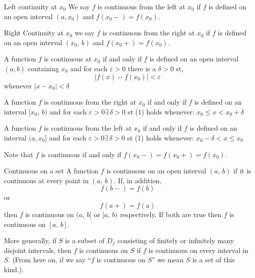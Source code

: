 \documentclass{article}
\renewcommand{\d}{\delta}
\newcommand{\e}{\varepsilon}
\newcommand{\ex}{\exists\,}
\begin{document}
{{\noindent\begin{definition}{Left continuity at $x_0$}{}
  We say $f$ is continuous from the left at $x_0$ if $f$ is defined on an open interval $(a, x_0)$ and $f(x_0-) = f(x_0)$.
\end{definition}\vspace{10pt}

\noindent\begin{definition}{Right Continuity at $x_0$}{}
  we say $f$ is continuous from the right at $x_0$ if $f$ is defined on an open interval $(x_0,\, b)$ and $f(x_0+) = f(x_0)$.
\end{definition}\vspace{10pt}

\begin{theorem}{}{}
  A function $f$ is continuous at $x_0$ if and only if $f$ is defined on an open interval $(a, b)$ containing $x_0$ and for each $\e>0$ there is a $\d>0$ st,
  \begin{equation}
    |f(x) - f(x_0)| < \e
  \end{equation}
  whenever $|x - x_0| < \d$
\end{theorem}

\begin{theorem}{}{}
  A function $f$ is continuous from the right at $x_0$ if and only if $f$ is defined on an interval $[x_0,\, b)$ and for each $\e > 0\ex\d > 0$ st (1) holds whenever: $\displaystyle{x_0 \le x < x_0 + \d}$
\end{theorem}

\begin{theorem}{}{}
  A function $f$ is continuous from the left at $x_0$ if and only if $f$ is defined on an interval $(a, x_0]$ and for each $\e > 0\ex\d > 0$ st (1) holds whenever: $\displaystyle{x_0 - \d < x \le x_0}$
\end{theorem}

Note that $f$ is continuous if and only if $f(x_0-) = f(x_0+) = f(x_0)$.\\

\noindent\begin{definition}{Continuous on a set}{}
 A function $f$ is continuous on an open interval $(a,\, b)$ if it is continuous at every point in $(a,\, b)$. If, in addition,
 \begin{equation}
   f(b-)=f(b)
 \end{equation}
 or
 \begin{equation}
   f(a+) = f(a)
 \end{equation}
 then $f$ is continuous on $(a,\,b]$ or $[a,\,b)$ respectively. If both are true then $f$ is continuous on $[a,\,b]$.
\end{definition}\vspace{10pt}
More generally, if $S$ is a subset of $D_f$ consisting of finitely or infinitely many disjoint intervals, then $f$ is continuous on $S$ if $f$ is continuous on every interval in $S$. (From here on, if we say ``$f$ is continuous on $S$'' we mean $S$ is a set of this kind.).

}}
\end{document}
